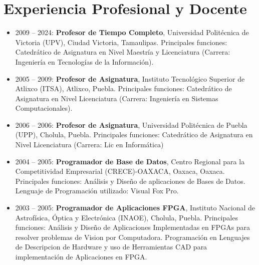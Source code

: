 \documentclass[letterpaper,10pt]{article}
\newcounter{num}
\begin{document}
\section{Experiencia Profesional y Docente}
 \begin{itemize}[leftmargin=0.15in, label={}]
\item 2009 -- 2024: \textbf{Profesor de Tiempo Completo}, Universidad Politécnica de Victoria (UPV), Ciudad Victoria, Tamaulipas.  Principales funciones: Catedrático de Asignatura en Nivel Maestría y Licenciatura (Carrera: Ingenier\'ia en Tecnologías de la Información).

\item 2005 -- 2009: \textbf{Profesor de Asignatura}, Instituto Tecnol\'ogico Superior de Atlixco (ITSA), Atlixco, Puebla. Principales funciones: Catedrático de Asignatura en Nivel Licenciatura (Carrera: Ingenier\'ia en Sistemas Computacionales). 

\item 2006 -- 2006: \textbf{Profesor de Asignatura}, Universidad Polit\'ecnica de Puebla (UPP), Cholula, Puebla. Principales funciones: Catedrático de Asignatura en Nivel Licenciatura (Carrera: Lic en Inform\'atica) 

\item 2004 -- 2005: \textbf{Programador de Base de Datos}, Centro Regional para la Competitividad Empresarial (CRECE)-OAXACA, Oaxaca, Oaxaca. Principales funciones: An\'alisis y Dise\~no de aplicaciones de Bases de Datos. Lenguaje de Programaci\'on utilizado: Visual Fox Pro. 

\item 2003 -- 2005: \textbf{Programador de Aplicaciones FPGA}, Instituto Nacional de Astrofísica, Óptica y Electrónica (INAOE), Cholula, Puebla. Principales funciones: Análisis y Diseño de Aplicaciones Implementadas en FPGAs para resolver problemas de Vision por Computadora. Programación en Lenguajes de Descripcion de Hardware y uso de Herramientas CAD para implementación de Aplicaciones en FPGA. 

 \end{itemize}
\end{document}
